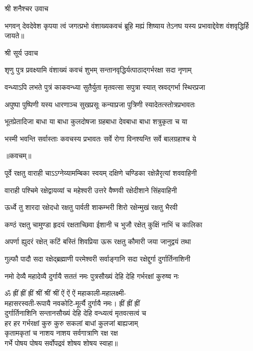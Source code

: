 
\centerline{श्री शनैश्चर उवाच}

\twolineshloka
{भगवन् देवदेवेश कृपया त्वं जगत्प्रभो}
{वंशाख्यकवचं ब्रूहि मह्यं शिष्याय तेऽनघ}%
{यस्य प्रभावाद्देवेश वंशवृद्धिर्हि जायते॥}

\centerline{श्री सूर्य उवाच}

\twolineshloka
{शृणु पुत्र प्रवक्ष्यामि वंशाख्यं कवचं शुभम्}
{सन्तानवृद्धिर्यत्पाठाद्गर्भरक्षा सदा नृणाम्}%

\twolineshloka
{वन्ध्याऽपि लभते पुत्रं काकवन्ध्या सुतैर्युता}
{मृतवत्सा सपुत्रा स्यात् स्रवद्गर्भा स्थिरप्रजा}%

\twolineshloka
{अपुष्पा पुष्पिणी यस्य धारणाञ्च सुखप्रसूः}
{कन्याप्रजा पुत्रिणी स्यादेतत्स्तोत्रप्रभावतः}%


\twolineshloka
{भूतप्रेतादिजा बाधा या बाधा कुलदोषजा}
{ग्रहबाधा देवबाधा बाधा शत्रुकृता च या}%

\twolineshloka
{भस्मी भवन्ति सर्वास्ताः कवचस्य प्रभावतः}
{सर्वे रोगा विनश्यन्ति सर्वे बालग्रहाश्च ये}%

\centerline{॥कवचम्॥}

\twolineshloka
{पूर्वे रक्षतु वाराही चाऽऽग्नेय्यामम्बिका स्वयम्}
{दक्षिणे चण्डिका रक्षेन्नैरृत्यां शववाहिनी}%

\twolineshloka
{वाराही पश्चिमे रक्षेद्वायव्यां च महेश्वरी}
{उत्तरे वैष्णवी रक्षेदीशाने सिंहवाहिनी}%

\twolineshloka
{ऊर्ध्वे तु शारदा रक्षेदधो रक्षतु पार्वती}
{शाकम्भरी शिरो रक्षेन्मुखं रक्षतु भैरवी}%

\twolineshloka
{कण्ठं रक्षतु चामुण्डा हृदयं रक्षताच्छिवा}
{ईशानी च भुजौ रक्षेत् कुक्षिं नाभिं च कालिका}%

\twolineshloka
{अपर्णा ह्युदरं रक्षेत् कटिं बस्तिं शिवप्रिया}
{ऊरू रक्षतु कौमारी जया जानुद्वयं तथा}%

\twolineshloka
{गुल्फौ पादौ सदा रक्षेद्ब्रह्माणी परमेश्वरी}
{सर्वाङ्गानि सदा रक्षेद्दुर्गा दुर्गार्तिनाशिनी}%

\twolineshloka
{नमो देव्यै महादेव्यै दुर्गायै सततं नमः}
{पुत्रसौख्यं देहि देहि गर्भरक्षां कुरुष्व नः}%

ॐ ह्रीं ह्रीं ह्रीं श्रीं श्रीं श्रीं ऐं ऐं ऐं महाकाली-महालक्ष्मी-\\
महासरस्वती-रूपायै नवकोटि-मूर्त्यै दुर्गायै नमः। ह्रीं ह्रीं ह्रीं\\
दुर्गार्तिनाशिनि सन्तानसौख्यं देहि देहि वन्ध्यत्वं मृतवत्सत्वं च\\
हर हर गर्भरक्षां कुरु कुरु सकलां बाधां कुलजां बाह्यजाम्\\
कृतामकृतां च नाशय नाशय सर्वगात्राणि रक्ष रक्ष \\
गर्भे पोषय पोषय सर्वोपद्रवं शोषय शोषय स्वाहा॥


